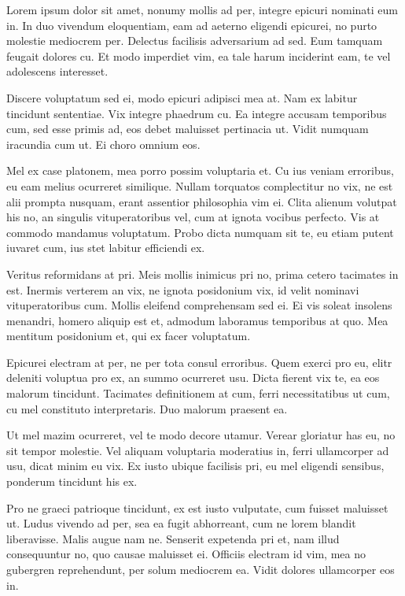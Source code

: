 \documentclass[11pt,a4paper]{report}
\begin{document}
    Lorem ipsum dolor sit amet, nonumy mollis ad per, integre epicuri nominati eum in. In duo vivendum eloquentiam, eam ad aeterno eligendi epicurei, no purto molestie mediocrem per. Delectus facilisis adversarium ad sed. Eum tamquam feugait dolores cu. Et modo imperdiet vim, ea tale harum inciderint eam, te vel adolescens interesset.
    
    Discere voluptatum sed ei, modo epicuri adipisci mea at. Nam ex labitur tincidunt sententiae. Vix integre phaedrum cu. Ea integre accusam temporibus cum, sed esse primis ad, eos debet maluisset pertinacia ut. Vidit numquam iracundia cum ut. Ei choro omnium eos.
    
    Mel ex case platonem, mea porro possim voluptaria et. Cu ius veniam erroribus, eu eam melius ocurreret similique. Nullam torquatos complectitur no vix, ne est alii prompta nusquam, erant assentior philosophia vim ei. Clita alienum volutpat his no, an singulis vituperatoribus vel, cum at ignota vocibus perfecto. Vis at commodo mandamus voluptatum. Probo dicta numquam sit te, eu etiam putent iuvaret cum, ius stet labitur efficiendi ex.
    
    \begin{multicols}{2}
        Veritus reformidans at pri. Meis mollis inimicus pri no, prima cetero tacimates in est. Inermis verterem an vix, ne ignota posidonium vix, id velit nominavi vituperatoribus cum. Mollis eleifend comprehensam sed ei. Ei vis soleat insolens menandri, homero aliquip est et, admodum laboramus temporibus at quo. Mea mentitum posidonium et, qui ex facer voluptatum.
        
        Epicurei electram at per, ne per tota consul erroribus. Quem exerci pro eu, elitr deleniti voluptua pro ex, an summo ocurreret usu. Dicta fierent vix te, ea eos malorum tincidunt. Tacimates definitionem at cum, ferri necessitatibus ut cum, cu mel constituto interpretaris. Duo malorum praesent ea.
        
        Ut mel mazim ocurreret, vel te modo decore utamur. Verear gloriatur has eu, no sit tempor molestie. Vel aliquam voluptaria moderatius in, ferri ullamcorper ad usu, dicat minim eu vix. Ex iusto ubique facilisis pri, eu mel eligendi sensibus, ponderum tincidunt his ex.
        
        Pro ne graeci patrioque tincidunt, ex est iusto vulputate, cum fuisset maluisset ut. Ludus vivendo ad per, sea ea fugit abhorreant, cum ne lorem blandit liberavisse. Malis augue nam ne. Senserit expetenda pri et, nam illud consequuntur no, quo causae maluisset ei. Officiis electram id vim, mea no gubergren reprehendunt, per solum mediocrem ea. Vidit dolores ullamcorper eos in.
    \end{multicols}
\end{document}
